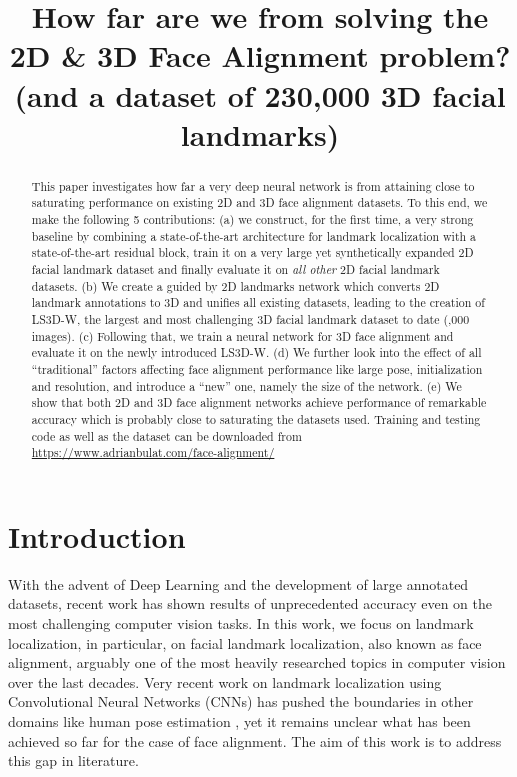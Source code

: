 \title{How far are we from solving the 2D & 3D Face Alignment problem? (and a dataset of 230,000 3D facial landmarks)}

\begin{abstract}
This paper investigates how far a very deep neural network is from attaining close to saturating performance on existing 2D and 3D face alignment datasets. To this end, we make the following 5 contributions: (a) we construct, for the first time, a very strong baseline by combining a state-of-the-art architecture for landmark localization with a state-of-the-art residual block, train it on a very large yet synthetically expanded 2D facial landmark dataset and finally evaluate it on \textit{all other} 2D facial landmark datasets. (b) We create a guided by 2D landmarks network which converts 2D landmark annotations to 3D and unifies all existing datasets, leading to the creation of LS3D-W, the largest and most challenging 3D facial landmark dataset to date (,000 images). (c) Following that, we train a neural network for 3D face alignment and evaluate it on the newly introduced LS3D-W. (d) We further look into the effect of all ``traditional''  factors affecting face alignment performance like large pose, initialization and resolution, and  introduce a ``new'' one, namely the size of the network. (e) We show that both 2D and 3D face alignment networks achieve performance of remarkable accuracy which is probably close to saturating the datasets used. Training and testing code as well as the dataset can be downloaded from \url{https://www.adrianbulat.com/face-alignment/}
\end{abstract}

\section{Introduction}
	With the advent of Deep Learning and the development of large annotated datasets, recent work has shown results of unprecedented accuracy even on the most challenging computer vision tasks.  In this work, we focus on landmark localization, in particular, on facial landmark localization, also known as face alignment, arguably one of the most heavily researched topics in computer vision over the last decades. Very recent work on landmark localization using Convolutional Neural Networks (CNNs) has pushed the boundaries in other domains like human pose estimation \cite{toshev2014deeppose, tompson2014joint, pfister2015flowing, insafutdinov2016deepercut, pishchulin2016deepcut, wei2016convolutional, newell2016stacked, bulat2016human}, yet it remains unclear what has been achieved so far for the case of face alignment. The aim of this work is to address this gap in literature.

